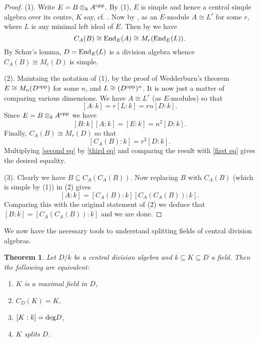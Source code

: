 \documentclass[11pt]{amsart}
\numberwithin{equation}{section}
\newtheorem{theorem}[equation]{Theorem}
\theoremstyle{remark}
\theoremstyle{remark}
\theoremstyle{remark}
\theoremstyle{definition}
\theoremstyle{definition}
\theoremstyle{definition}
\theoremstyle{definition}
\theoremstyle{definition}
\theoremstyle{definition}
\begin{document}
\begin{proof}
(1). Write $E=B\otimes_k A^\textup{opp}$. By  (1), $E$ is simple and hence a central simple algebra over its centre, $K$ say, cf. .  Now by , as an $E$-module $A\cong L^r$ for some $r$, where $L$ is any minimal left ideal of $E$. Then by  we have
\[C_A(B)\cong \textup{End}_E(A)\cong M_r(\textup{End}_E(L)).\] 
By Schur's lemma, $D=\textup{End}_E(L)$ is a division algebra whence $C_A(B)\cong M_r(D)$ is simple. 

(2). Maintaing the notation of (1), by the proof of Wedderburn's theorem $E\cong M_n(D^\textup{opp})$ for some $n$, and $L\cong (D^\textup{opp})^n$. It is now just a matter of comparing various dimensions. We have $A\cong L^r$ (as $E$-modules) so that \begin{equation} \label{first eq}
[A:k]=r[L:k]=rn[D:k].
\end{equation}
Since $E=B\otimes_k A^\textup{opp}$ we have \begin{equation} \label{second eq}
[B:k][A:k]=[E:k]=n^2[D:k].\end{equation}
 Finally, $C_A(B)\cong M_r(D)$ so that 
\begin{equation} \label{third eq}
[C_A(B):k]=r^2[D:k].\end{equation}
Multiplying \cref{second eq} by \cref{third eq} and comparing the result with \cref{first eq} gives the desired equality.

(3). Clearly we have $B\subseteq C_A(C_A(B))$. Now replacing $B$ with $C_A(B)$ (which is simple by (1)) in (2) gives
\[[A:k]=[C_A(B):k][C_A(C_A(B)):k].\]
Comparing this with the original statement of (2) we deduce that $[B:k]=[C_A(C_A(B)):k]$ and we are done.
\end{proof}

We now have the necessary tools to understand splitting fields of central division algebras.

\begin{theorem} \label{main splitting field theorem}
Let $D/k$ be a central division algebra and $k\subseteq K\subseteq D$ a field. Then the following are equivalent:
\begin{enumerate}
\item $K$ is a maximal field in $D$,
\item $C_D(K)=K$,
\item $[K:k]=\textup{deg}D$,
\item $K$ splits $D$.
\end{enumerate}
\end{theorem}
\end{document}
